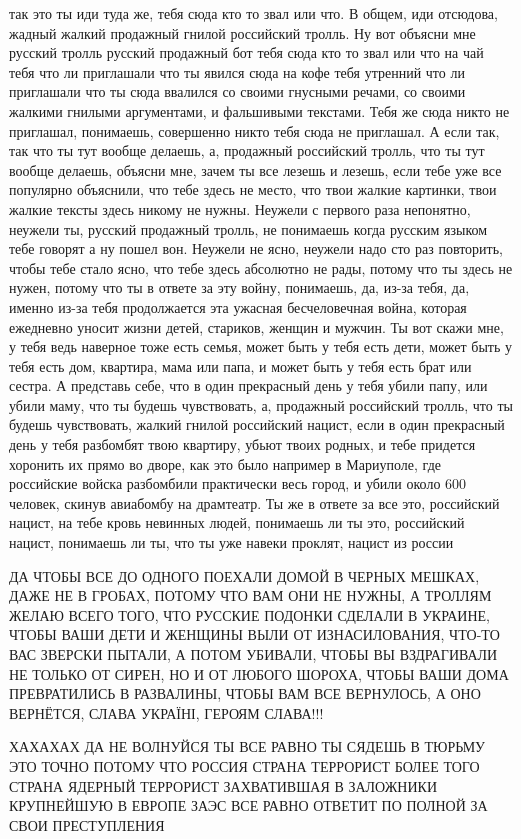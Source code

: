 так это ты иди туда же, тебя сюда кто то звал или что. В общем, иди отсюдова,
жадный жалкий продажный гнилой российский тролль. Ну вот объясни мне русский
тролль русский продажный бот тебя сюда кто то звал или что на чай тебя что ли
приглашали что ты явился сюда на кофе тебя утренний что ли приглашали что ты
сюда ввалился со своими гнусными речами, со своими жалкими гнилыми аргументами,
и фальшивыми текстами. Тебя же сюда никто не приглашал, понимаешь, совершенно
никто тебя сюда не приглашал. А если так, так что ты тут вообще делаешь, а,
продажный российский тролль, что ты тут вообще делаешь, объясни мне, зачем ты
все лезешь и лезешь, если тебе уже все популярно объяснили, что тебе здесь не
место, что твои жалкие картинки, твои жалкие тексты здесь никому не нужны.
Неужели с первого раза непонятно, неужели ты, русский продажный тролль, не
понимаешь когда русским языком тебе говорят а ну пошел вон. Неужели не ясно,
неужели надо сто раз повторить, чтобы тебе стало ясно, что тебе здесь абсолютно
не рады, потому что ты здесь не нужен, потому что ты в ответе за эту войну,
понимаешь, да, из-за тебя, да, именно из-за тебя продолжается эта ужасная
бесчеловечная война, которая ежедневно уносит жизни детей, стариков, женщин и
мужчин. Ты вот скажи мне, у тебя ведь наверное тоже есть семья, может быть у
тебя есть дети, может быть у тебя есть дом, квартира, мама или папа, и может
быть у тебя есть брат или сестра. А представь себе, что в один прекрасный день
у тебя убили папу, или убили маму, что ты будешь чувствовать, а, продажный
российский тролль, что ты будешь чувствовать, жалкий гнилой российский нацист,
если в один прекрасный день у тебя разбомбят твою квартиру, убьют твоих родных,
и тебе придется хоронить их прямо во дворе, как это было например в Мариуполе,
где российские войска разбомбили практически весь город, и убили около 600
человек, скинув авиабомбу на драмтеатр. Ты же в ответе за все это, российский
нацист, на тебе кровь невинных людей, понимаешь ли ты это, российский нацист,
понимаешь ли ты, что ты уже навеки проклят, нацист из россии

ДА ЧТОБЫ ВСЕ ДО ОДНОГО ПОЕХАЛИ ДОМОЙ В ЧЕРНЫХ МЕШКАХ, ДАЖЕ НЕ В ГРОБАХ, ПОТОМУ
ЧТО ВАМ ОНИ НЕ НУЖНЫ, А ТРОЛЛЯМ ЖЕЛАЮ ВСЕГО ТОГО, ЧТО РУССКИЕ ПОДОНКИ СДЕЛАЛИ В
УКРАИНЕ, ЧТОБЫ ВАШИ ДЕТИ И ЖЕНЩИНЫ ВЫЛИ ОТ ИЗНАСИЛОВАНИЯ, ЧТО-ТО ВАС ЗВЕРСКИ
ПЫТАЛИ, А ПОТОМ УБИВАЛИ, ЧТОБЫ ВЫ ВЗДРАГИВАЛИ НЕ ТОЛЬКО ОТ СИРЕН, НО И ОТ
ЛЮБОГО ШОРОХА, ЧТОБЫ ВАШИ ДОМА ПРЕВРАТИЛИСЬ В РАЗВАЛИНЫ, ЧТОБЫ ВАМ ВСЕ
ВЕРНУЛОСЬ, А ОНО ВЕРНЁТСЯ, СЛАВА УКРАЇНІ, ГЕРОЯМ СЛАВА!!!

ХАХАХАХ ДА НЕ ВОЛНУЙСЯ ТЫ ВСЕ РАВНО ТЫ СЯДЕШЬ В ТЮРЬМУ ЭТО ТОЧНО ПОТОМУ ЧТО
РОССИЯ СТРАНА ТЕРРОРИСТ БОЛЕЕ ТОГО СТРАНА ЯДЕРНЫЙ ТЕРРОРИСТ ЗАХВАТИВШАЯ В
ЗАЛОЖНИКИ КРУПНЕЙШУЮ В ЕВРОПЕ ЗАЭС ВСЕ РАВНО ОТВЕТИТ ПО ПОЛНОЙ ЗА СВОИ
ПРЕСТУПЛЕНИЯ

